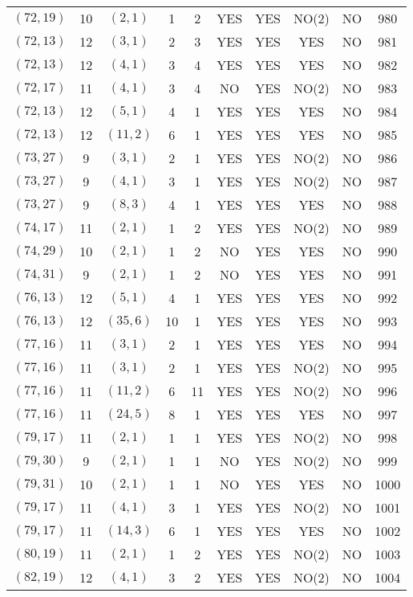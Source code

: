 \begin{longtable}{|c|c|c|c|c|c|c|c|c|c|}
$(72, 19)$ & 10 & $(2, 1)$ & 1 & 2 & YES & YES & NO(2) & NO & 980\\
$(72, 13)$ & 12 & $(3, 1)$ & 2 & 3 & YES & YES & YES & NO & 981\\
$(72, 13)$ & 12 & $(4, 1)$ & 3 & 4 & YES & YES & YES & NO & 982\\
$(72, 17)$ & 11 & $(4, 1)$ & 3 & 4 & NO & YES & NO(2) & NO & 983\\
$(72, 13)$ & 12 & $(5, 1)$ & 4 & 1 & YES & YES & YES & NO & 984\\
$(72, 13)$ & 12 & $(11, 2)$ & 6 & 1 & YES & YES & YES & NO & 985\\
$(73, 27)$ & 9 & $(3, 1)$ & 2 & 1 & YES & YES & NO(2) & NO & 986\\
$(73, 27)$ & 9 & $(4, 1)$ & 3 & 1 & YES & YES & NO(2) & NO & 987\\
$(73, 27)$ & 9 & $(8, 3)$ & 4 & 1 & YES & YES & YES & NO & 988\\
$(74, 17)$ & 11 & $(2, 1)$ & 1 & 2 & YES & YES & NO(2) & NO & 989\\
$(74, 29)$ & 10 & $(2, 1)$ & 1 & 2 & NO & YES & YES & NO & 990\\
$(74, 31)$ & 9 & $(2, 1)$ & 1 & 2 & NO & YES & YES & NO & 991\\
$(76, 13)$ & 12 & $(5, 1)$ & 4 & 1 & YES & YES & YES & NO & 992\\
$(76, 13)$ & 12 & $(35, 6)$ & 10 & 1 & YES & YES & YES & NO & 993\\
$(77, 16)$ & 11 & $(3, 1)$ & 2 & 1 & YES & YES & YES & NO & 994\\
$(77, 16)$ & 11 & $(3, 1)$ & 2 & 1 & YES & YES & NO(2) & NO & 995\\
$(77, 16)$ & 11 & $(11, 2)$ & 6 & 11 & YES & YES & NO(2) & NO & 996\\
$(77, 16)$ & 11 & $(24, 5)$ & 8 & 1 & YES & YES & YES & NO & 997\\
$(79, 17)$ & 11 & $(2, 1)$ & 1 & 1 & YES & YES & NO(2) & NO & 998\\
$(79, 30)$ & 9 & $(2, 1)$ & 1 & 1 & NO & YES & NO(2) & NO & 999\\
$(79, 31)$ & 10 & $(2, 1)$ & 1 & 1 & NO & YES & YES & NO & 1000\\
$(79, 17)$ & 11 & $(4, 1)$ & 3 & 1 & YES & YES & NO(2) & NO & 1001\\
$(79, 17)$ & 11 & $(14, 3)$ & 6 & 1 & YES & YES & YES & NO & 1002\\
$(80, 19)$ & 11 & $(2, 1)$ & 1 & 2 & YES & YES & NO(2) & NO & 1003\\
$(82, 19)$ & 12 & $(4, 1)$ & 3 & 2 & YES & YES & NO(2) & NO & 1004\\

\end{longtable}
